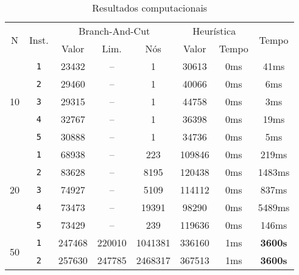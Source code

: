 \documentclass{article}
\begin{document}
\begin{table}[ht]
    \centering
    \begin{tabular}{c|c|c|c|c|c|c|c}
        \hline
        \multirow{2}{0.6cm}{N}&\multirow{2}{1cm}{Inst.} & \multicolumn{3}{c|}{Branch-And-Cut} & \multicolumn{2}{c|}{Heurística} & \multirow{2}{1.15cm}{Tempo}\\
        \cline{3-7}
        &&Valor & Lim. & Nós & Valor & Tempo \\
        \hline\hline

        \multirow{5}{0.6cm}{10}
        &{\tt 1} & 23432 & -- & 1 & 30613 & 0ms & 41ms \\
        &{\tt 2} & 29460 & -- & 1 & 40066 & 0ms & 6ms \\
        &{\tt 3} & 29315 & -- & 1 & 44758 & 0ms & 3ms \\
        &{\tt 4} & 32767 & -- & 1 & 36398 & 0ms & 19ms \\
        &{\tt 5} & 30888 & -- & 1 & 34736 & 0ms & 5ms \\

        \hline\multirow{5}{0.6cm}{20}
        &{\tt 1} & 68938 & -- & 223 & 109846 & 0ms & 219ms\\
        &{\tt 2} & 83628 & -- & 8195 & 120438 & 0ms & 1483ms \\
        &{\tt 3} & 74927 & -- & 5109 & 114112 & 0ms & 837ms \\
        &{\tt 4} & 73473 & -- & 19391 & 98290 & 0ms & 5489ms \\
        &{\tt 5} & 73429 & -- & 239 & 119636 & 0ms & 146ms\\

        \hline\multirow{2}{0.6cm}{50}
        &{\tt 1} & 247468 & 220010 & 1041381 & 336160 & 1ms & {\bf 3600s}\\
        &{\tt 2} & 257630 & 247785 & 2468317 & 367513 & 1ms & {\bf 3600s}
    \end{tabular}
    \caption{Resultados computacionais}
    \label{tab:computational-results}
\end{table}
\end{document}

